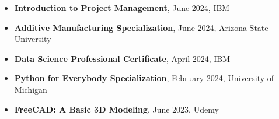 

\begin{cvparagraph}

\begin{itemize}

\item \textcolor{russell}{\textbf{Introduction to Project Management}, June 2024, IBM}

\item \textcolor{russell}{\textbf{Additive Manufacturing Specialization}, June 2024, Arizona State University}
\item \textcolor{russell}{\textbf{Data Science Professional Certificate}, April 2024, IBM}
\item \textcolor{russell}{\textbf{Python for Everybody Specialization},  February 2024, University of Michigan}

\item \textcolor{russell}{\textbf{FreeCAD: A Basic 3D Modeling}, June 2023, Udemy}

\end{itemize}
\end{cvparagraph}